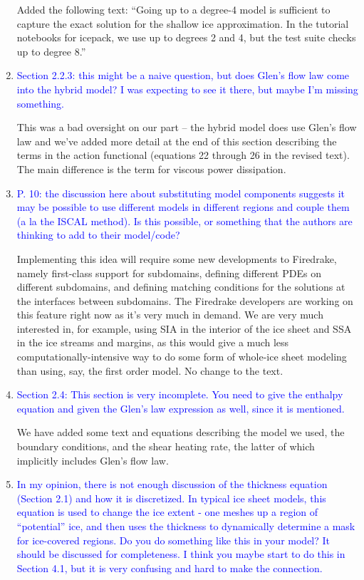 \documentclass{article}
\theoremstyle{definition}
\theoremstyle{plain}
\begin{document}
\begin{enumerate}
Added the following text: ``Going up to a degree-4 model is sufficient to capture the exact solution for the shallow ice approximation.
In the tutorial notebooks for icepack, we use up to degrees 2 and 4, but the test suite checks up to degree 8.''
\item \textcolor{blue}{Section 2.2.3: this might be a naive question, but does Glen's flow law come into the hybrid model?
I was expecting to see it there, but maybe I'm missing something.}

This was a bad oversight on our part -- the hybrid model does use Glen's flow law and we've added more detail at the end of this section describing the terms in the action functional (equations 22 through 26 in the revised text).
The main difference is the term for viscous power dissipation.
\item \textcolor{blue}{P. 10: the discussion here about substituting model components suggests it may be possible to use
different models in different regions and couple them (a la the ISCAL method). Is this possible, or
something that the authors are thinking to add to their model/code?}

Implementing this idea will require some new developments to Firedrake, namely first-class support for subdomains, defining different PDEs on different subdomains, and defining matching conditions for the solutions at the interfaces between subdomains.
The Firedrake developers are working on this feature right now as it's very much in demand.
We are very much interested in, for example, using SIA in the interior of the ice sheet and SSA in the ice streams and margins, as this would give a much less computationally-intensive way to do some form of whole-ice sheet modeling than using, say, the first order model.
No change to the text.

\item \textcolor{blue}{Section 2.4: This section is very incomplete. You need to give the enthalpy equation and given the
Glen's law expression as well, since it is mentioned.}

We have added some text and equations describing the model we used, the boundary conditions, and the shear heating rate, the latter of which implicitly includes Glen's flow law.
\item \textcolor{blue}{In my opinion, there is not enough discussion of the thickness equation (Section 2.1) and how it
is discretized. In typical ice sheet models, this equation is used to change the ice extent - one
meshes up a region of ``potential'' ice, and then uses the thickness to dynamically determine a mask
for ice-covered regions. Do you do something like this in your model? It should be discussed for
completeness. I think you maybe start to do this in Section 4.1, but it is very confusing and hard to
make the connection.}


\end{enumerate}
\end{document}
